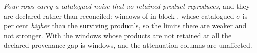 \emph{Four rows carry a catalogued noise that no retained product
reproduces}, and they are declared rather than reconciled: \PbGapN{} windows
of \PbGapStar{} in block \texttt{\PbGapEb}, whose catalogued $\sigma$ is
\PbGapPctLo--\PbGapPctHi{} per cent \emph{higher} than the surviving
product's, so the limits there are weaker and not stronger. With the
\PbGapNoProd{} windows whose products are not retained at all the declared
provenance gap is \PbGapDeclared{} windows, and the attenuation columns are
unaffected.


